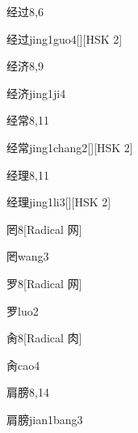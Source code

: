 \begin{entry}{经过}{8,6}
  \begin{phonetics}{经过}{jing1guo4}[][HSK 2]
  \end{phonetics}
\end{entry}

\begin{entry}{经济}{8,9}
  \begin{phonetics}{经济}{jing1ji4}
  \end{phonetics}
\end{entry}

\begin{entry}{经常}{8,11}
  \begin{phonetics}{经常}{jing1chang2}[][HSK 2]
  \end{phonetics}
\end{entry}

\begin{entry}{经理}{8,11}
  \begin{phonetics}{经理}{jing1li3}[][HSK 2]
  \end{phonetics}
\end{entry}

\begin{entry}{罔}{8}[Radical 网]
  \begin{phonetics}{罔}{wang3}
  \end{phonetics}
\end{entry}

\begin{entry}{罗}{8}[Radical 网]
  \begin{phonetics}{罗}{luo2}
  \end{phonetics}
\end{entry}

\begin{entry}{肏}{8}[Radical 肉]
  \begin{phonetics}{肏}{cao4}
  \end{phonetics}
\end{entry}

\begin{entry}{肩膀}{8,14}
  \begin{phonetics}{肩膀}{jian1bang3}
  \end{phonetics}
\end{entry}

